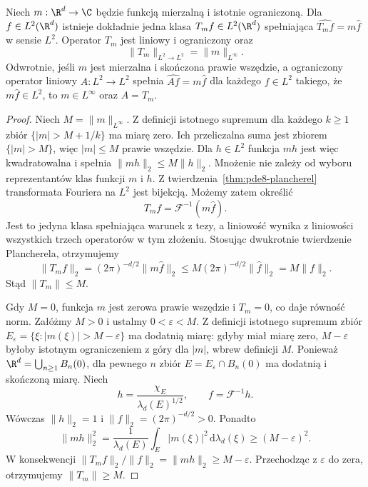 \begin{twierdzenie}[Mnożnik w $L^2$]
\label{thm:pde8-multiplier}
Niech $m:\R^d\to\C$ będzie funkcją mierzalną i
istotnie ograniczoną. Dla $f\in L^2(\R^d)$ istnieje
dokładnie jedna klasa $T_mf\in L^2(\R^d)$ spełniająca
$\widehat{T_mf}=m\widehat f$ w sensie $L^2$.
Operator $T_m$ jest liniowy i ograniczony oraz
\[
 \|T_m\|_{L^2\to L^2}=\|m\|_{L^\infty}.
\]
Odwrotnie, jeśli $m$ jest mierzalna i skończona
prawie wszędzie, a ograniczony operator liniowy
$A:L^2\to L^2$ spełnia $\widehat{Af}=m\widehat f$
dla każdego $f\in L^2$ takiego, że
$m\widehat f\in L^2$, to $m\in L^\infty$
oraz $A=T_m$.
\end{twierdzenie}
\begin{proof}
Niech $M=\|m\|_{L^\infty}$. Z definicji istotnego
supremum dla każdego $k\ge1$ zbiór
$\{|m|>M+1/k\}$ ma miarę zero.
Ich przeliczalna suma jest zbiorem $\{|m|>M\}$,
więc $|m|\le M$ prawie wszędzie.
Dla $h\in L^2$ funkcja $mh$ jest więc kwadratowalna
i spełnia $\|mh\|_2\le M\|h\|_2$.
Mnożenie nie zależy od wyboru reprezentantów
klas funkcji $m$ i $h$.
Z twierdzenia~\ref{thm:pde8-plancherel}
transformata Fouriera na $L^2$ jest bijekcją.
Możemy zatem określić
\[
 T_mf=\mathcal F^{-1}(m\widehat f).
\]
Jest to jedyna klasa spełniająca warunek
z tezy, a liniowość wynika z liniowości
wszystkich trzech operatorów w tym złożeniu.
Stosując dwukrotnie twierdzenie Plancherela,
otrzymujemy
\[
 \|T_mf\|_2=(2\pi)^{-d/2}\|m\widehat f\|_2
 \le M(2\pi)^{-d/2}\|\widehat f\|_2
 =M\|f\|_2.
\]
Stąd $\|T_m\|\le M$.

Gdy $M=0$, funkcja $m$ jest zerowa prawie
wszędzie i $T_m=0$, co daje równość norm.
Załóżmy $M>0$ i ustalmy $0<\varepsilon<M$.
Z definicji istotnego supremum zbiór
$E_\varepsilon=\{\xi:|m(\xi)|>M-\varepsilon\}$
ma dodatnią miarę: gdyby miał miarę zero,
$M-\varepsilon$ byłoby istotnym ograniczeniem
z góry dla $|m|$, wbrew definicji $M$.
Ponieważ $\R^d=\bigcup_{n\ge1}B_n(0)$,
dla pewnego $n$ zbiór
$E=E_\varepsilon\cap B_n(0)$ ma dodatnią
i skończoną miarę. Niech
\[
 h=\frac{\chi_E}{\lambda_d(E)^{1/2}},
 \qquad f=\mathcal F^{-1}h.
\]
Wówczas $\|h\|_2=1$ i
$\|f\|_2=(2\pi)^{-d/2}>0$. Ponadto
\[
 \|mh\|_2^2
 =\frac1{\lambda_d(E)}\int_E|m(\xi)|^2
 \,\mathrm d\lambda_d(\xi)
 \ge(M-\varepsilon)^2.
\]
W konsekwencji
$\|T_mf\|_2/\|f\|_2=\|mh\|_2\ge M-\varepsilon$.
Przechodząc z $\varepsilon$ do zera,
otrzymujemy $\|T_m\|\ge M$.


\end{proof}
